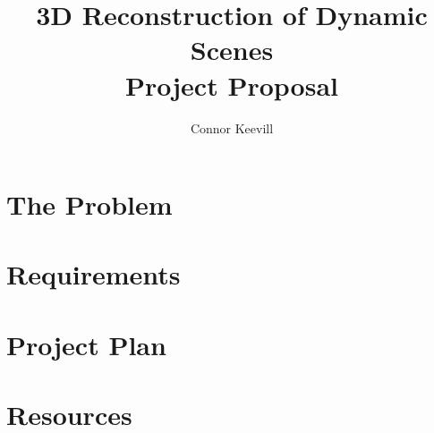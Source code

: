 \documentclass[11pt]{article}
\title{
	{3D Reconstruction of Dynamic Scenes} \\[1ex]
	\large Project Proposal
}
\author{Connor Keevill}
\begin{document}
	\maketitle

	\pagebreak
	\tableofcontents
	\pagebreak

	\twocolumn

	\section{The Problem}\label{sec:the-problem}
	

	\section{Requirements}\label{sec:requirements}
	

	\section{Project Plan}\label{sec:project-plan}
	

	\section{Resources}\label{sec:resources}
	

	\newpage
	
	
\end{document}
